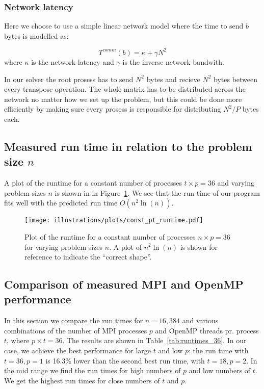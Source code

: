 \subsubsection{Network latency} %
\label{ssub:network_latency}

Here we choose to use a simple linear network model where the time to send $b$ bytes is modelled as:
\begin{center}
  \begin{equation}
    T^{comm}(b) = \kappa + \gamma N^2
  \end{equation}
  where $\kappa$ is the network latency and $\gamma$ is the inverse network bandwith.
\end{center}

In our solver the root prosess has to send $N^2$ bytes and recieve $N^2$ bytes between every transpose operation. The whole matrix has to be distributed across the network no matter how we set up the problem, but this could be done more efficiently by making sure every prosess is responsible for distributing $N^2/P$ bytes each.





\subsection{Measured run time in relation to the problem size $n$} %
\label{sub:run_time_in_relation_to_the_problem_size_n_}

A plot of the runtime for a constant number of processes $t\times p = 36$ and varying problem sizes $n$ is shown in in Figure~\ref{fig:runtime_const_pt}. We see that the run time of our program fits well with the predicted run time $O(n^2 \ln(n))$.

\begin{figure}[htbp]
  \centering
  \texttt{[image: illustrations/plots/const\_pt\_runtime.pdf]}
  \caption{Plot of the runtime for a constant number of processes $n\times p = 36$ for varying problem sizes $n$. A plot of $n^2 \ln(n)$ is shown for reference to indicate the ``correct shape''.}
  \label{fig:runtime_const_pt}
\end{figure}


\subsection{Comparison of measured MPI and OpenMP performance} %
\label{sub:comparison_of_mpi_and_openmp_performance}
In this section we compare the run times for $n=16,384$ and various combinations of the number of MPI processes $p$ and OpenMP threads pr. process $t$, where $p\times t = 36$. The results are shown in Table~\ref{tab:runtimes_36}. In our case, we achieve the best performance for large $t$ and low $p$: the run time with $t=36, p=1$ is 16.3\% lower than the second best run time, with $t=18, p=2$. In the mid range we find the run times for high numbers of $p$ and low numbers of $t$. We get the highest run times for close numbers of $t$ and $p$.

